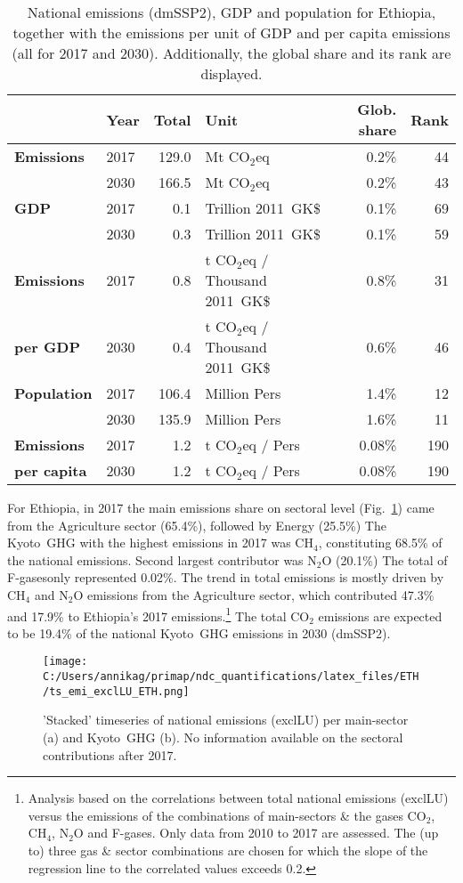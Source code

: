 \documentclass[12pt]{article}
\begin{document}
 \begin{table}[H]
 \centering
 \caption{National emissions (dmSSP2), GDP and population for Ethiopia, together with the emissions per unit of GDP and per capita emissions (all for 2017 and 2030). 
 Additionally, the global share and its rank are displayed.}
 \label{tab:overview}
 \begin{tabular}{l || l r l r r}
 \bfseries  & \bfseries Year & \bfseries Total & \bfseries Unit & \bfseries Glob. share & \bfseries Rank \tabularnewline \hline \hline
 \bfseries Emissions & 2017 & 129.0 & Mt CO$_2$eq & 0.2\% & 44 \tabularnewline 
 \bfseries  & 2030 & 166.5 & Mt CO$_2$eq & 0.2\% & 43 \tabularnewline \hline
 \bfseries GDP & 2017 & 0.1 & Trillion 2011~GK\$ & 0.1\% & 69 \tabularnewline 
 \bfseries  & 2030 & 0.3 & Trillion 2011~GK\$ & 0.1\% & 59 \tabularnewline \hline
 \bfseries Emissions & 2017 & 0.8 & t CO$_2$eq / Thousand 2011~GK\$ & 0.8\% & 31 \tabularnewline 
 \bfseries per GDP & 2030 & 0.4 & t CO$_2$eq / Thousand 2011~GK\$ & 0.6\% & 46 \tabularnewline \hline
 \bfseries Population & 2017 & 106.4 & Million Pers & 1.4\% & 12 \tabularnewline 
 \bfseries  & 2030 & 135.9 & Million Pers & 1.6\% & 11 \tabularnewline \hline
 \bfseries Emissions & 2017 & 1.2 & t CO$_2$eq /  Pers & 0.08\% & 190 \tabularnewline 
 \bfseries per capita & 2030 & 1.2 & t CO$_2$eq /  Pers & 0.08\% & 190 \tabularnewline 
 \end{tabular}
 \end{table}

 For Ethiopia, in 2017 the main emissions share on sectoral level (Fig.~\ref{fig:tsEmi}) came from the Agriculture sector (65.4\%), followed by Energy (25.5\%)
 The Kyoto~GHG with the highest emissions in 2017 was CH$_4$, constituting  68.5\% of the national emissions. 
 Second largest contributor was N$_2$O (20.1\%)
 The total of F-gasesonly represented 0.02\%.
 The trend in total emissions is mostly driven by CH$_4$ and N$_2$O emissions from the Agriculture sector, which contributed 47.3\% and 17.9\% to Ethiopia's 2017 emissions.\footnote{Analysis based on the correlations between total national emissions (exclLU) versus the emissions of the combinations of main-sectors \& the gases CO$_2$, CH$_4$, N$_2$O and F-gases. 
 Only data from 2010 to 2017 are assessed. 
 The (up to) three gas \& sector combinations are chosen for which the slope of the regression line to the correlated values exceeds 0.2.}
 The total CO$_2$ emissions are expected to be 19.4\% of the national Kyoto~GHG emissions in 2030 (dmSSP2).

 \begin{figure}[H]
 \centering
 \texttt{[image: C:/Users/annikag/primap/ndc\_quantifications/latex\_files/ETH/ts\_emi\_exclLU\_ETH.png]}
 \caption{'Stacked' timeseries of national emissions (exclLU) per main-sector (a) and Kyoto~GHG (b). 
 No information available on the sectoral contributions after 2017.}
 \label{fig:tsEmi}
 \end{figure}
\end{document}
